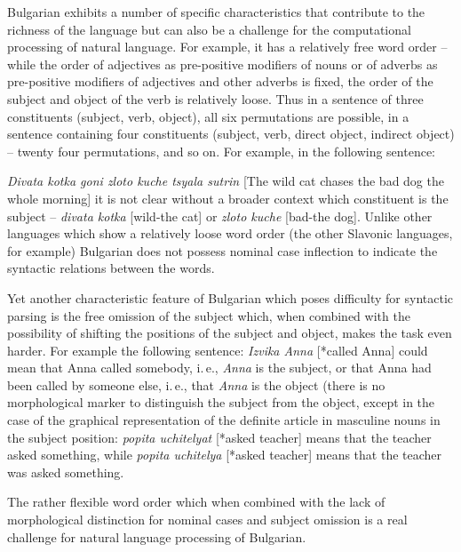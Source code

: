 \documentclass[]{../../metanetpaper}
\begin{document}
\begin{multicols}{2}

Bulgarian exhibits a number of specific characteristics that contribute to the richness of the language but can also be a challenge for the computational processing of natural language. For example, it has a relatively free word order – while the order of adjectives as pre-positive modifiers of nouns or of adverbs as pre-positive modifiers of adjectives and other adverbs is fixed, the order of the subject and object of the verb is relatively loose. Thus in a sentence of three constituents (subject, verb, object), all six permutations are possible, in a sentence containing four constituents (subject, verb, direct object, indirect object) -- twenty four permutations, and so on. For example, in the following sentence:

 \textit{{Divata kotka goni zloto kuche tsyala sutrin}} [The wild cat chases the bad dog the whole morning] it is not clear without a broader context which constituent is the subject -- \textit{{divata kotka}} [wild-the cat] or \textit{{zloto kuche}} [bad-the dog]. Unlike other languages which show a relatively loose word order (the other Slavonic languages, for example) Bulgarian does not possess nominal case inflection to indicate the syntactic relations between the words.

Yet another characteristic feature of Bulgarian which poses difficulty for syntactic parsing is the free omission of the subject which, when combined with the possibility of shifting the positions of the subject and object, makes the task even harder. For example the following sentence: \textit{{Izvika Anna}} [*called Anna] could mean that Anna called somebody, i.\,e.,  \textit{Anna} is the subject, or that Anna had been called by someone else, i.\,e., that  \textit{Anna} is the object (there is no morphological marker to distinguish the subject from the object, except in the case of the graphical representation of the definite article in masculine nouns in the subject position: \textit{{popita uchitelyat}} [*asked teacher] means that the teacher asked something, while \textit{{popita uchitelya}} [*asked teacher] means that the teacher was asked something. 

The rather flexible word order which when combined with the lack of morphological distinction for nominal cases and subject omission is a real challenge for natural language processing of Bulgarian.


\end{multicols}
\end{document}
